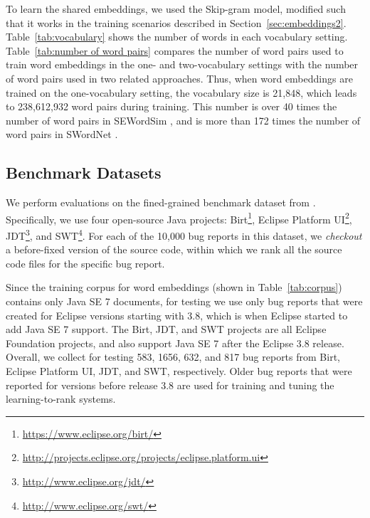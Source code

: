 To learn the shared embeddings, we used the Skip-gram model, modified such that it works in the training scenarios described in Section~\ref{sec:embeddings2}. Table~\ref{tab:vocabulary} shows the number of words in each vocabulary setting.  Table~\ref{tab:number of word pairs} compares the number of word pairs used to train word embeddings in the one- and two-vocabulary settings with the number of word pairs used in two related approaches. Thus, when word embeddings are trained on the one-vocabulary setting, the vocabulary size is 21,848, which leads to 238,612,932 word pairs during training. This number is over 40 times the number of word pairs in SEWordSim \cite{Tian:2014:SSW:2591062.2591071}, and is more than 172 times the number of word pairs in SWordNet \cite{6224276}.

\subsection{Benchmark Datasets}
\label{sec:evaluation:subject systems}

We perform evaluations on the fined-grained benchmark dataset from \cite{ye:fse14}. Specifically, we use four open-source Java projects: Birt\footnote{\url{https://www.eclipse.org/birt/}}, Eclipse Platform UI\footnote{\url{http://projects.eclipse.org/projects/eclipse.platform.ui}}, JDT\footnote{\url{http://www.eclipse.org/jdt/}}, and SWT\footnote{\url{http://www.eclipse.org/swt/}}. For each of the 10,000 bug reports in this dataset, we {\it checkout} a before-fixed version of the source code, within which we rank all the source code files for the specific bug report.

Since the training corpus for word embeddings (shown in Table~\ref{tab:corpus}) contains only Java SE 7 documents, for testing we use only bug reports that were created for Eclipse versions starting with 3.8, which is when Eclipse started to add Java SE 7 support. The Birt, JDT, and SWT projects are all Eclipse Foundation projects, and also support Java SE 7 after the Eclipse 3.8 release. Overall, we collect for testing 583, 1656, 632, and 817 bug reports from Birt, Eclipse Platform UI, JDT, and SWT, respectively. Older bug reports that were reported for versions before release 3.8 are used for training and tuning the learning-to-rank systems.

